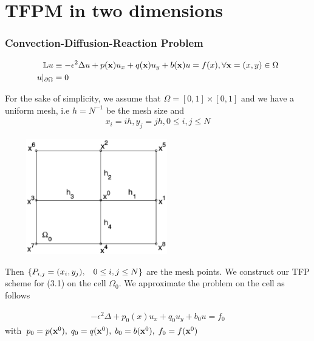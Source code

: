
\chapter{TFPM in two dimensions} %

\label{Chapter3} %


\subsection{Convection-Diffusion-Reaction Problem}

\begin{align}
\mathbb{L}u & \equiv  -\epsilon^{2} \Delta u + p(\textbf{x})u_{x} + q(\textbf{x})u_{y} + b(\textbf{x})u = f(x), \forall \textbf{x} = (x,y) \in \Omega\\
u \large{|}_{\partial{\Omega}} & = 0
\end{align}

For the sake of simplicity, we assume that $\Omega = [0,1] \times [0,1]$ and we have a uniform mesh, i.e
$h = N^{-1}$ be the mesh size and 
\begin{align}
 x_{i} = ih, y_{j} = jh, 0 \leq i , j \leq N
\end{align}

\includegraphics[width =8cm,height = 5cm]{Figures/cell_1.eps}

Then $\{ P_{i,j} = (x_i , y_j ), \hspace{0.3cm} 0 \leq i, j \leq N \}$ are the mesh points.
We construct our TFP scheme for (3.1) on the cell $\Omega_{0}$. We approximate the 
problem  on the cell as follows

\begin{align}
 -\epsilon^{2}\Delta+p_{0}(x)u_{x} + q_{0}u_{y} + b_{0}u = f_{0}
\end{align}
with $p_{0} = p(\textbf{x}^{0}),\hspace{1mm} q_{0} = q(\textbf{x}^{0}),\hspace{1mm} b_{0} = b(\textbf{x}^{0}),\hspace{1mm} f_{0} = f(\textbf{x}^{0})$\\

